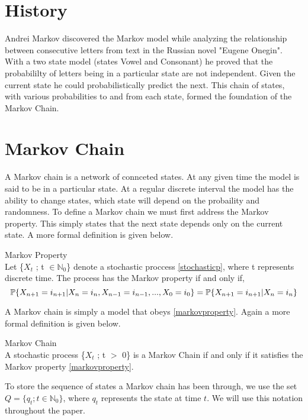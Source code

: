 \section{History}
Andrei Markov discovered the Markov model while analyzing the relationship between consecutive letters from text in the Russian novel "Eugene Onegin". With a two state model (states Vowel and Consonant) he proved that the probabililty of letters being in a particular state are not independent. Given the current state he could probabilistically predict the next. This chain of states, with various probabilities to and from each state, formed the foundation of the Markov Chain.

\section{Markov Chain}
A Markov chain is a network of connceted states. At any given time the model is said to be in a particular state. At a regular discrete interval the model has the ability to change states, which state will depend on the probaility and randomness. To define a Markov chain we must first address the Markov property. This simply states that the next state depends only on the current state. A more formal definition is given below. 

\begin{definition}
\label{markovproperty}
	Markov Property \\
	Let \{$X_t$ ; t $\in \mathbb{N}_0$\} denote a stochastic proccess \ref{stochasticp}, where t represents discrete time. The process has the Markov property if and only if,
	\begin{equation}
		\mathbb{P} \{X_{n+1} = i_{n+1} | X_n = i_n, X_{n-1} = i_{n-1},...,X_0 = i_0\} = \mathbb{P} \{X_{n+1} = 				i_{n+1} | X_n = i_n\}
	\end{equation}
\end{definition}


A Markov chain is simply a model that obeys \ref{markovproperty}. Again a more formal definition is given below.

\begin{definition}
\label{markovchain}
	Markov Chain \\
	A stochastic process \{$X_t$ ; t $>$ 0\} is a Markov Chain if and only if it satisfies the Markov property \ref{markovproperty}.
\end{definition}

To store the sequence of states a Markov chain has been through, we use the set $Q = \{q_t ; t \in \mathbb{N}_0\}$, where $q_t$ represents the state at time $t$. We will use this notation throughout the paper.

